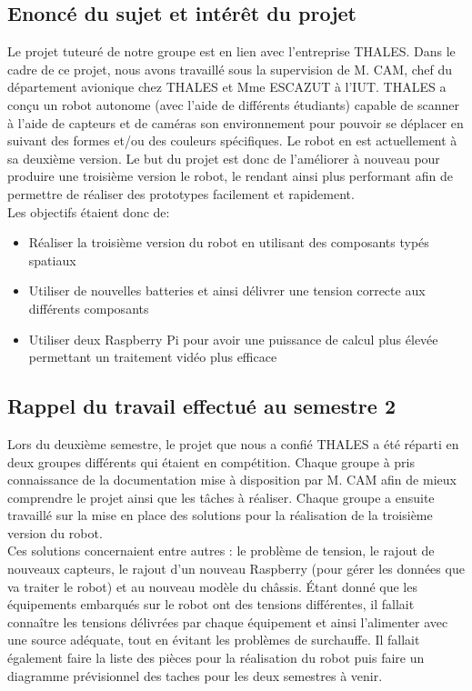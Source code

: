 \documentclass{PackagerQualityN}
\begin{document}
\subsection*{Enoncé du sujet et intérêt du projet}
Le projet tuteuré de notre groupe est en lien avec l’entreprise THALES.
Dans le cadre de ce projet, nous avons travaillé sous la supervision de M. CAM, chef du département avionique chez THALES et Mme ESCAZUT à l’IUT.
THALES a conçu un robot autonome (avec l'aide de différents étudiants) capable de scanner à l’aide de capteurs et de caméras son environnement pour pouvoir se déplacer en suivant des formes et/ou des couleurs spécifiques. Le robot en est actuellement à sa deuxième version. Le but du projet est donc de l'améliorer à nouveau pour produire une troisième version le robot, le rendant ainsi plus performant afin de permettre de réaliser des prototypes facilement et rapidement.\\

Les objectifs étaient donc de:
\begin{itemize}
\item  Réaliser la troisième version du robot en utilisant des composants typés spatiaux
\item  Utiliser de nouvelles batteries et ainsi délivrer une tension correcte aux différents composants
\item  Utiliser deux Raspberry Pi pour avoir une puissance de calcul plus élevée permettant un traitement vidéo plus efficace
\end{itemize}

\subsection*{Rappel du travail effectué au semestre 2}
Lors du deuxième semestre, le projet que nous a confié THALES a été réparti en deux groupes différents qui étaient en compétition. Chaque groupe à pris connaissance de la documentation mise à disposition par M. CAM afin de mieux comprendre le projet ainsi que les tâches à réaliser. Chaque groupe a ensuite travaillé sur la mise en place des solutions pour la réalisation de la troisième version du robot.\\

Ces solutions concernaient entre autres : le problème de tension, le rajout de nouveaux capteurs, le rajout d’un nouveau Raspberry (pour gérer les données que va traiter le robot) et au nouveau modèle du châssis. Étant donné que les équipements embarqués sur le robot ont des tensions différentes, il fallait connaître les tensions délivrées par chaque équipement et ainsi l'alimenter avec une source adéquate, tout en évitant les problèmes de surchauffe. Il fallait également faire la liste des pièces pour la réalisation du robot puis faire un diagramme prévisionnel des taches pour les deux semestres à venir.\\ %
\end{document}
